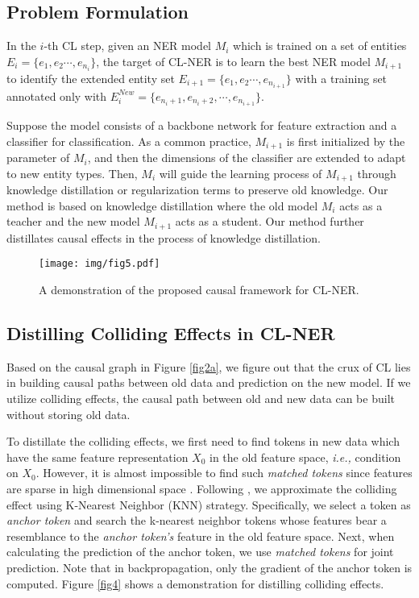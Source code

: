 \documentclass[11pt]{article}
\begin{document}
\subsection{Problem Formulation}
In the $i$-th CL step, given an NER model $M_i$ which is trained on a set of entities $E_i=\{ e_1, e_2 \cdots, e_{n_i} \}$, the target of CL-NER is to learn the best NER model $M_{i+1}$ to identify the extended entity set $E_{i+1}=\{ e_1, e_2 \cdots, e_{n_{i+1}} \}$  with a training set annotated only with $E_i^{New} = \{ e_{n_i+1}, e_{n_i+2}, \cdots, e_{n_{i+1}} \}$.

Suppose the model consists of a backbone network for feature extraction and a classifier for classification.
As a common practice, $M_{i+1}$ is first initialized by the parameter of $M_i$, and then the dimensions of the classifier are extended to adapt to new entity types.    
Then, $M_i$ will guide the learning process of $M_{i+1}$ through knowledge distillation \citep{monaikul2021continual} or regularization terms \citep{douillard2020podnet} to preserve old knowledge.
Our method is based on knowledge distillation where the old model $M_i$ acts as a teacher and the new model $M_{i+1}$ acts as a student.
Our method further distillates causal effects in the process of knowledge distillation.

\begin{figure*}[!t]
    \centering
    \texttt{[image: img/fig5.pdf]}
    \caption{A demonstration of the proposed causal framework for CL-NER.}
    \label{fig5}
\end{figure*}

\subsection{Distilling Colliding Effects in CL-NER}
Based on the causal graph in Figure \ref{fig2a}, we figure out that the crux of CL lies in building causal paths between old data and prediction on the new model.
If we utilize colliding effects, the causal path between old and new data can be built without storing old data.

To distillate the colliding effects, we first need to find tokens in new data which have the same feature representation $X_0$ in the old feature space, \textit{i.e.,} condition on $X_0$.
However, it is almost impossible to find such \textit{matched tokens} since features are sparse in high dimensional space \citep{altman2018curse}.
Following \citet{hu2021distilling}, we approximate the colliding effect using K-Nearest Neighbor (KNN) strategy.
Specifically, we select a token as \textit{anchor token} and search the k-nearest neighbor tokens whose features bear a resemblance to the \textit{anchor token's} feature in the old feature space.
Next, when calculating the prediction of the anchor token, we use \textit{matched tokens} for joint prediction.
Note that in backpropagation, only the gradient of the anchor token is computed.
Figure \ref{fig4} shows a demonstration for distilling colliding effects.
\end{document}
